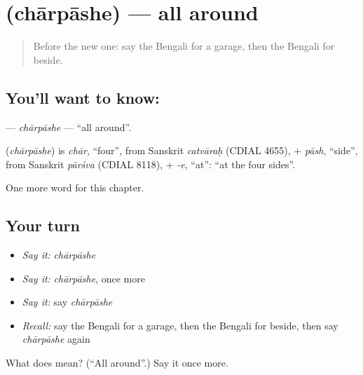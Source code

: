 \section[\texorpdfstring{\bn{চারপাশে} (chārpāshe)}{চারপাশে (chārpāshe)}]{ (chārpāshe) — all around}

\label{lesson:BN-C216-charpashe}



\begin{quote}
Before the new one: say the Bengali for a garage, then the Bengali for beside.
\end{quote}

\subsection*{You'll want to know: }
\textbf{} — \emph{chārpāshe} — \textquotedblleft{}all around\textquotedblright{}.

\begin{cousinweb}
\textbf{} (\emph{chārpāshe}) is \emph{chār}, \textquotedblleft{}four\textquotedblright{}, from Sanskrit \emph{catvāraḥ} (CDIAL 4655), + \emph{pāsh}, \textquotedblleft{}side\textquotedblright{}, from Sanskrit \emph{pārśva} (CDIAL 8118), + \emph{-e}, \textquotedblleft{}at\textquotedblright{}: \textquotedblleft{}at the four sides\textquotedblright{}.
\end{cousinweb}

\begin{grammarlens}[title={What you've built}]
One more word for this chapter.
\end{grammarlens}

\subsection*{Your turn}
\begin{itemize}
\raggedright
  \item \emph{Say it:} \emph{chārpāshe}
  \item \emph{Say it:} \emph{chārpāshe}, once more
  \item \emph{Say it:} say \emph{chārpāshe}
  \item \emph{Recall:} say the Bengali for a garage, then the Bengali for beside, then say \emph{chārpāshe} again
\end{itemize}

\begin{tcolorbox}[breakable,colback=teal!4,colframe=teal!35!black,title={Before you move on}]
What does  mean? (\textquotedblleft{}All around\textquotedblright{}.) Say it once more.
\end{tcolorbox}
